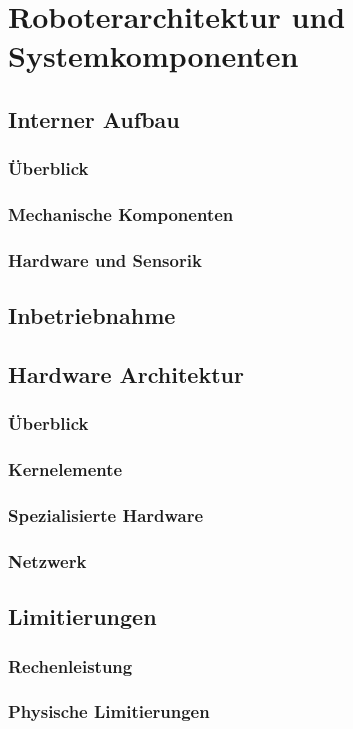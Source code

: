 \section{Roboterarchitektur und Systemkomponenten}

\subsection{Interner Aufbau}
\subsubsection{Überblick}
\subsubsection{Mechanische Komponenten}
\subsubsection{Hardware und Sensorik}

\subsection{Inbetriebnahme}

\subsection{Hardware Architektur}
\subsubsection{Überblick}
\subsubsection{Kernelemente}
\subsubsection{Spezialisierte Hardware}
\subsubsection{Netzwerk}

\subsection{Limitierungen}
\subsubsection{Rechenleistung}
\subsubsection{Physische Limitierungen}